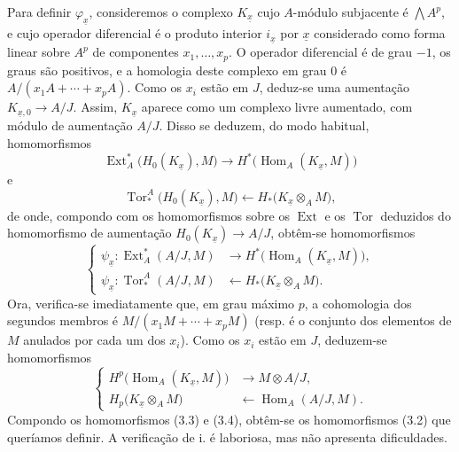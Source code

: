 Para definir $\varphi_{\underline{x}}$, consideremos o complexo
$K_{\underline{x}}$ cujo $A$-módulo subjacente é $\bigwedge A^{p}$, e
cujo operador diferencial é o produto interior $i_{\underline{x}}$ por
$\underline{x}$ considerado como forma linear sobre $A^{p}$ de componentes
$x_1,\ldots,x_p$. O operador diferencial é de grau $-1$, os graus são
positivos, e a homologia deste complexo em grau $0$ é
$A/(x_1A+\cdots+x_pA)$. Como os $x_i$ estão em $J$, deduz-se uma
aumentação $K_{\underline{x},0}\longrightarrow A/J$. Assim,
$K_{\underline{x}}$ aparece como um complexo livre aumentado, com módulo
de aumentação $A/J$. Disso se deduzem, do modo habitual, homomorfismos
\[
\operatorname{Ext}_{A}^{*}\bigl(H_0(K_{\underline{x}}),M\bigr)
\longrightarrow
H^{*}\bigl(\operatorname{Hom}_{A}(K_{\underline{x}},M)\bigr)
\]
e
\[
\operatorname{Tor}_{*}^{A}\bigl(H_0(K_{\underline{x}}),M\bigr)
\longleftarrow
H_{*}\bigl(K_{\underline{x}}\otimes_A M\bigr),
\]
de onde, compondo com os homomorfismos sobre os $\operatorname{Ext}$ e os
$\operatorname{Tor}$ deduzidos do homomorfismo de aumentação
$H_0(K_{\underline{x}})\longrightarrow A/J$, obtêm-se homomorfismos
\begin{equation}\tag{3.3}
\left\{
\begin{aligned}
\psi_{\underline{x}}:
\operatorname{Ext}_{A}^{*}(A/J,M)
&\longrightarrow H^{*}\bigl(\operatorname{Hom}_{A}(K_{\underline{x}},M)\bigr),\\
\psi_{\underline{x}}:
\operatorname{Tor}_{*}^{A}(A/J,M)
&\longleftarrow H_{*}\bigl(K_{\underline{x}}\otimes_A M\bigr).
\end{aligned}
\right.
\end{equation}
Ora, verifica-se imediatamente que, em grau máximo $p$, a cohomologia dos segundos
membros é $M/(x_1M+\cdots+x_pM)$ (resp. é o conjunto dos elementos de $M$
anulados por cada um dos $x_i$). Como os $x_i$ estão em $J$, deduzem-se
homomorfismos
\begin{equation}\tag{3.4}
\left\{
\begin{aligned}
H^{p}\bigl(\operatorname{Hom}_{A}(K_{\underline{x}},M)\bigr)
&\longrightarrow M\otimes A/J,\\
H_{p}\bigl(K_{\underline{x}}\otimes_A M\bigr)
&\longleftarrow\operatorname{Hom}_{A}(A/J,M).
\end{aligned}
\right.
\end{equation}
Compondo os homomorfismos (3.3) e (3.4), obtêm-se os homomorfismos (3.2)
que queríamos definir. A verificação de i. é laboriosa, mas não
apresenta dificuldades.

